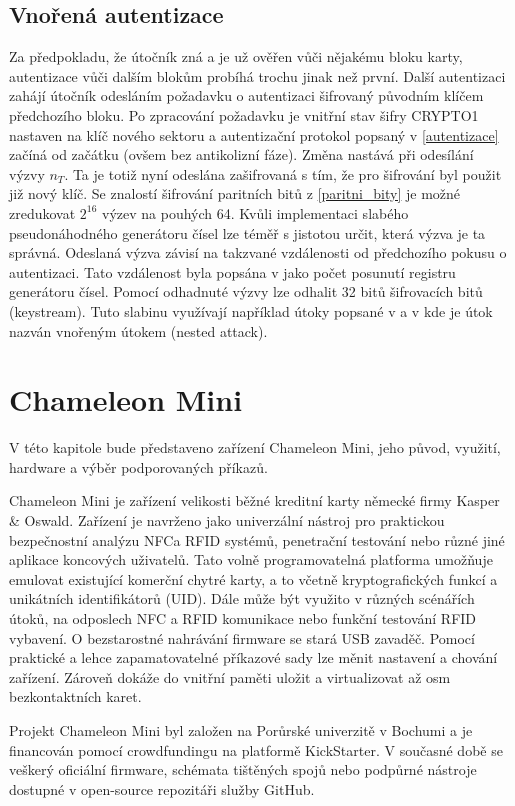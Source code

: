 \section{Vnořená autentizace}
Za předpokladu, že útočník zná a je už ověřen vůči nějakému bloku karty, autentizace vůči dalším blokům probíhá trochu jinak než první. Další autentizaci zahájí útočník odesláním požadavku o autentizaci šifrovaný původním klíčem předchozího bloku. Po zpracování požadavku je vnitřní stav šifry CRYPTO1 nastaven na klíč nového sektoru a autentizační protokol popsaný v \ref{autentizace} začíná od začátku (ovšem bez antikolizní fáze). Změna nastává při odesílání výzvy $n_T$. Ta je totiž nyní odeslána zašifrovaná s tím, že pro šifrování byl použit již nový klíč. Se znalostí šifrování paritních bitů z \ref{paritni_bity} je možné zredukovat $2^{16}$ výzev na pouhých 64. Kvůli implementaci slabého pseudonáhodného generátoru čísel lze téměř s jistotou určit, která výzva je ta správná. Odeslaná výzva závisí na takzvané vzdálenosti od předchozího pokusu o autentizaci. Tato vzdálenost byla popsána v \cite{Dismantling_Mifare_Classic} jako počet posunutí registru generátoru čísel. Pomocí odhadnuté výzvy lze odhalit 32 bitů šifrovacích bitů (keystream)\cite{Dismantling_Mifare_Classic}.
Tuto slabinu využívají například útoky popsané v \cite{Cryptanalisis} a v \cite{Wirelessly_Pickpocketing} kde je útok nazván vnořeným útokem (nested attack).

\chapter{Chameleon Mini}
\label{chameleon_mini}
V této kapitole bude představeno zařízení Chameleon Mini, jeho původ, využití, hardware a výběr podporovaných příkazů.
\par

Chameleon Mini je zařízení velikosti běžné kreditní karty německé firmy Kasper \& Oswald.  Zařízení je navrženo jako univerzální nástroj pro praktickou bezpečnostní analýzu NFC\footnotemark a RFID systémů, penetrační testování nebo různé jiné aplikace koncových uživatelů. Tato volně programovatelná platforma umožňuje emulovat existující komerční chytré karty, a to včetně kryptografických funkcí a unikátních identifikátorů (UID). Dále může být využito v různých scénářích útoků, na odposlech NFC a RFID komunikace nebo funkční testování RFID vybavení. O bezstarostné nahrávání firmware se stará USB zavaděč. Pomocí praktické a lehce zapamatovatelné příkazové sady lze měnit nastavení a chování zařízení. Zároveň dokáže do vnitřní paměti uložit a virtualizovat až osm bezkontaktních karet.\cite{ChameleonKickStarter} 
\par 
Projekt Chameleon Mini byl založen na Porůrské univerzitě v Bochumi a je financován pomocí crowdfundingu na platformě KickStarter. V současné době se veškerý oficiální firmware, schémata tištěných spojů nebo podpůrné nástroje dostupné v {open-source} repozitáři služby GitHub\footnotemark.\cite{ChameleonDocs}

